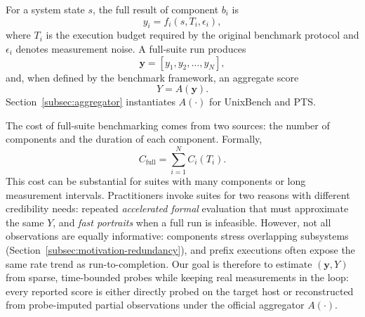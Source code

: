 \documentclass[sigplan,10pt]{acmart}
\begin{document}
For a system state \(s\), the full result of component \(b_i\) is
\begin{equation}
\label{eq:component-score}
y_i = f_i(s,T_i,\epsilon_i),
\end{equation}
where \(T_i\) is the execution budget required by the original benchmark protocol and \(\epsilon_i\) denotes measurement noise. A full-suite run produces
\begin{equation}
\label{eq:result-vector}
\mathbf{y}=[y_1,y_2,\ldots,y_N],
\end{equation}
and, when defined by the benchmark framework, an aggregate score
\begin{equation}
\label{eq:aggregate-score}
Y=A(\mathbf{y}).
\end{equation}
Section~\ref{subsec:aggregator} instantiates $A(\cdot)$ for UnixBench and PTS.

The cost of full-suite benchmarking comes from two sources: the number of components and the duration of each component. Formally,
\begin{equation}
\label{eq:full-cost}
C_{\mathrm{full}}=\sum_{i=1}^{N}C_i(T_i).
\end{equation}
This cost can be substantial for suites with many components or long measurement intervals.
Practitioners invoke suites for two reasons with different credibility needs: repeated \emph{accelerated formal} evaluation that must approximate the same $Y$, and \emph{fast portraits} when a full run is infeasible.
However, not all observations are equally informative: components stress overlapping subsystems (Section~\ref{subsec:motivation-redundancy}), and prefix executions often expose the same rate trend as run-to-completion.
Our goal is therefore to estimate $(\mathbf{y},Y)$ from sparse, time-bounded probes while keeping real measurements in the loop: every reported score is either directly probed on the target host or reconstructed from probe-imputed partial observations under the official aggregator $A(\cdot)$.
\end{document}
